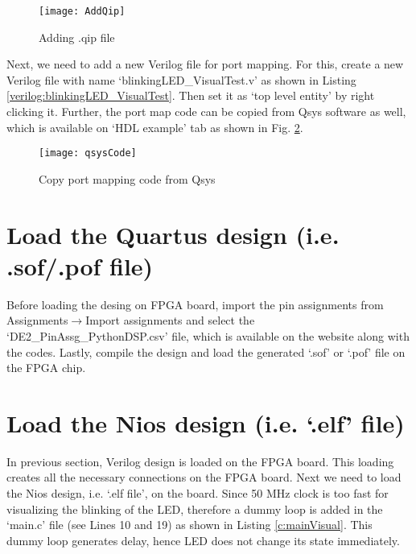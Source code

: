 \begin{figure}[!h]
	\centering
	\texttt{[image: AddQip]}
	\caption{Adding .qip file}
	\label{fig:AddQip}
\end{figure}

Next, we need to add a new Verilog file for port mapping. For this, create a new Verilog file with name `blinkingLED\_VisualTest.v' as shown in Listing \ref{verilog:blinkingLED_VisualTest}. Then set it as `top level entity' by right clicking it. Further, the port map code can be copied from Qsys software as well, which is available on `HDL example' tab as shown in Fig. \ref{fig:qsysVerilogCode}.

\begin{figure}[!h]
	\centering
	\texttt{[image: qsysCode]}
	\caption{Copy port mapping code from Qsys}
	\label{fig:qsysVerilogCode}
\end{figure}


\section{Load the Quartus design (i.e. .sof/.pof file)}\label{sec:AddLoadVHDL}
Before loading the desing on FPGA board, import the pin assignments from Assignments$\rightarrow$Import assignments and select the `DE2\_PinAssg\_PythonDSP.csv' file, which is available on the website along with the codes. Lastly, compile the design and load the generated `.sof' or `.pof' file on the FPGA chip.  




\section{Load the Nios design (i.e. `.elf' file)}\label{sec:AddLoadNIOS}
In previous section, Verilog design is loaded on the FPGA board. This loading creates all the necessary connections on the FPGA board. Next we need to load the Nios design, i.e. `.elf file', on the board. Since 50 MHz clock is too fast for visualizing the blinking of the LED, therefore a dummy loop is added in the `main.c' file (see Lines 10 and 19) as shown in Listing \ref{c:mainVisual}. This dummy loop generates delay, hence LED does not change its state immediately. 



